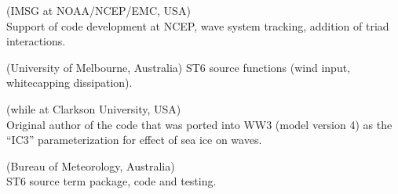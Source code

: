 \begin{list}{\ldots}{ }
\item [Andr\'e van der Westhuysen](IMSG at NOAA/NCEP/EMC, USA) \\
  Support of code development at NCEP, wave system tracking, addition of triad interactions.

\item [Ian Young] (University of Melbourne, Australia)
  ST6 source functions (wind input, whitecapping dissipation).

\item [Xin Zhao] (while at Clarkson University, USA) \\
  Original author of the code that was ported into WW3 (model version 4) as the ``IC3'' parameterization for effect of sea ice on waves.

\item [Stefan Zieger] (Bureau of Meteorology, Australia) \\
  ST6 source term package, code and testing.
\end{list}
